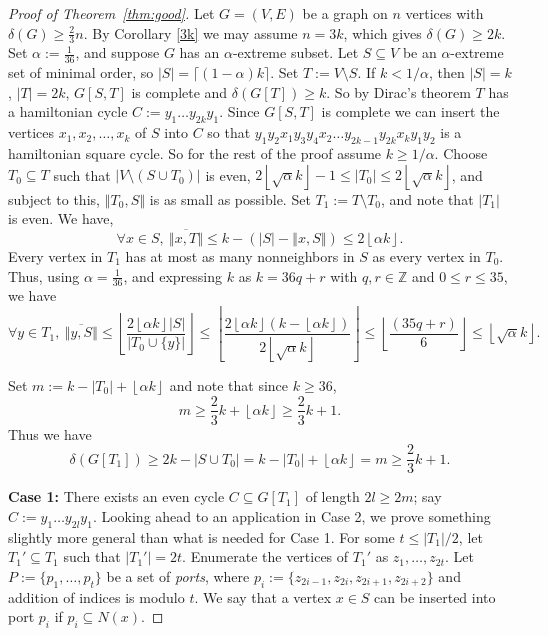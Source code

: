 \documentclass[oneside,12pt]{memoir}
\newcommand{\floor}[1]{\left\lfloor#1\right\rfloor}
\begin{document}
\begin{proof}[Proof of Theorem~\ref{thm:good}]
Let $G=(V,E)$ be a graph on $n$ vertices with $\delta(G)\geq \frac{2}{3}n$.  By Corollary \ref{3k} we may assume $n=3k$, which gives $\delta(G)\geq 2k$. Set $\alpha:=\frac{1}{36}$, and suppose $G$ has an $\alpha$-extreme
subset.  Let $S\subseteq V$ be an $\alpha$-extreme set of minimal order, so $|S|= \lceil (1-\alpha)k\rceil$. Set $T:=V\setminus S$. If $k<1/\alpha$, then $|S|=k$, $|T|=2k$, $G[S,T]$ is complete and $\delta(G[T])\geq k$.  So by Dirac's theorem $T$ has a hamiltonian cycle $C:=y_1\dots y_{2k}y_1$. Since $G[S,T]$ is complete we can insert the vertices $x_1, x_2, \dots, x_k$ of $S$ into $C$ so that $y_1y_2x_1y_3y_4x_2\dots y_{2k-1}y_{2k}x_ky_1y_2$ is a hamiltonian square cycle.  So for the rest of the proof assume $k\geq 1/\alpha$.  Choose $T_{0}\subseteq T$ such that $|V\setminus (S\cup T_0)|$ is even, 
$2\floor{\sqrt{\alpha}k}-1\leq|T_0|\le 2\floor{\sqrt{\alpha}k}$, and subject to this, $\left\Vert T_{0},S\right\Vert $
is as small as possible. Set $T_{1}:=T\setminus T_{0}$, and note that $|T_1|$ is even. We have, 
\begin{equation}
\forall x\in S,~\overline{\left\Vert x,T\right\Vert }\le k-(|S|-\left\Vert x,S\right\Vert) \leq 2\floor{\alpha k}.\label{eq:degx}\end{equation}
Every vertex in $T_1$ has at most as many nonneighbors in $S$ as every vertex in $T_0$. Thus, using $\alpha=\frac{1}{36}$, and expressing $k$ as $k=36q+r$ with $q,r\in \mathbb{Z}$ and $0\le r \le 35$, we have %
\begin{equation}
\forall y\in T_{1},~\overline{\left\Vert y,S\right\Vert }\leq \floor{\frac{2\floor{\alpha k}|S|}{|T_{0}\cup \{y\}|}}\leq \floor{\frac{2\floor{\alpha k}(k-\floor{\alpha k})}{2\floor{\sqrt{\alpha}k}}} \le \floor{\frac{(35q+r)}{6}}{\leq} \floor{\sqrt{\alpha}k}.
\label{eq:degy}
\end{equation}

Set $m:=k-|T_0|+\floor{\alpha k}$ and note that since $k\geq 36$,
\begin{equation}\label{eq:m}
m\geq \frac{2}{3}k+\floor{\alpha k}\geq \frac{2}{3}k+1. %
\end{equation}
Thus we have \begin{equation}
\delta(G[T_{1}])\geq 2k-|S\cup T_{0}|=k-|T_0|+\floor{\alpha k}=m\ge\frac{2}{3}k+1.\label{eq:T_1}
\end{equation}

\noindent 
\textbf{Case 1: }There exists an even cycle \textbf{$C\subseteq G[T_{1}]$}
of length $2l\geq2m$; say $C:=y_{1}\dots y_{2l}y_{1}$.  Looking ahead to an application in Case 2, we prove something slightly more general than what is needed for Case 1.  For some $t\leq |T_1|/2$, let $T_1'\subseteq T_1$ such that $|T_1'|=2t$.  Enumerate the vertices of $T_1'$ as $z_1,\dots,z_{2t}$.  Let $P:=\{p_{1},\dots,p_{t}\}$ be a set of \emph{ports}, where $p_{i}:=\{z_{2i-1},z_{2i},z_{2i+1},z_{2i+2}\}$ and addition of indices is modulo $t$.  We say that a vertex $x\in S$ can be inserted into port $p_{i}$ if $p_{i}\subseteq N(x)$.


\end{proof}
\end{document}
